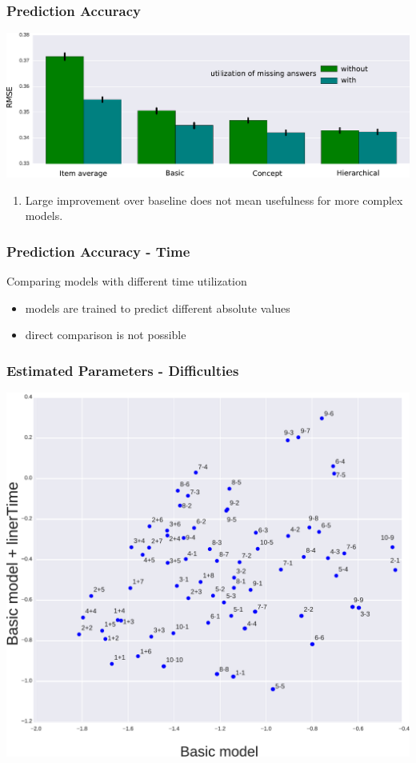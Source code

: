 \documentclass[xcolor=svgnames]{beamer}
\begin{document}
\begin{frame}
    \frametitle{Prediction Accuracy}

    \includegraphics[width=\linewidth]{figures/missing-answers}

    \begin{enumerate}
        \item Large improvement over baseline does not mean usefulness for more complex models.
    \end{enumerate}
\end{frame}
\begin{frame}
    \frametitle{Prediction Accuracy - Time}

    Comparing models with different time utilization
    \begin{itemize}
        \item models are trained to predict different absolute values
        \item direct comparison is not possible
    \end{itemize}
\end{frame}
\begin{frame}
    \frametitle{Estimated Parameters - Difficulties}

    \includegraphics[width=0.8\linewidth]{figures/difficulties-one-color}
\end{frame}
\end{document}
